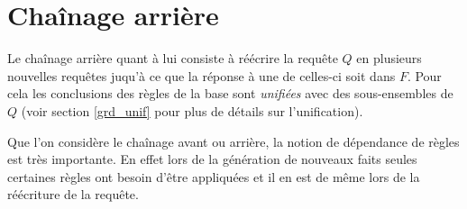 
\section{Chaînage arrière}\label{def_backward}
Le chaînage arrière quant à lui consiste à réécrire la requête $Q$ en plusieurs nouvelles
requêtes juqu'à ce que la réponse à une de celles-ci soit dans $F$.
Pour cela les conclusions des règles de la base sont {\em unifiées} avec 
des sous-ensembles de $Q$ (voir section \ref{grd_unif}
pour plus de détails sur l'unification).

Que l'on considère le chaînage avant ou arrière, la notion de dépendance de règles est
très importante. En effet lors de la génération de nouveaux faits seules certaines règles
ont besoin d'être appliquées et il en est de même lors de la réécriture de la requête.

